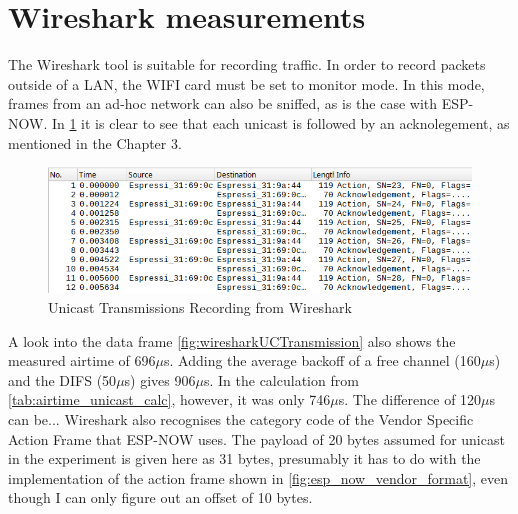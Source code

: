 \section{Wireshark measurements}

The Wireshark tool is suitable for recording traffic.
In order to record packets outside of a LAN, the WIFI card must be set to monitor mode.
In this mode, frames from an ad-hoc network can also be sniffed, as is the case with ESP-NOW.
In \cref{fig:wiresharkUC} it is clear to see that each unicast is followed by an acknolegement, as mentioned in the Chapter 3.

\begin{figure}[h]
	\centering
	\includegraphics[scale=0.5]{figures/wiresharkUC.pdf}
	\caption{Unicast Transmissions Recording from Wireshark}
	\label{fig:wiresharkUC}
\end{figure}

A look into the data frame \cref{fig:wiresharkUCTransmission} also shows the measured airtime of 696$\mu$s.
Adding the average backoff of a free channel (160$\mu$s) and the DIFS (50$\mu$s) gives 906$\mu$s.
In the calculation from \cref{tab:airtime_unicast_calc}, however, it was only 746$\mu$s.
The difference of 120$\mu$s can be... 
Wireshark also recognises the category code of the Vendor Specific Action Frame that ESP-NOW uses.
The payload of 20 bytes assumed for unicast in the experiment is given here as 31 bytes,
presumably it has to do with the implementation of the action frame shown in \cref{fig:esp_now_vendor_format},
even though I can only figure out an offset of 10 bytes.


